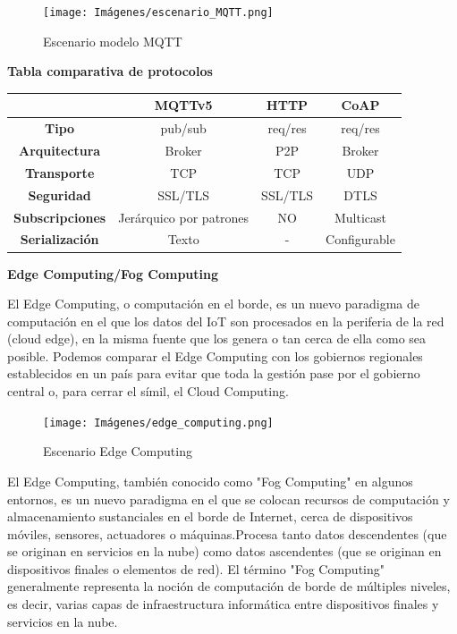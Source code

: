 \begin{figure}[ht]
    \centering
    \texttt{[image: Imágenes/escenario\_MQTT.png]}
    \caption{Escenario modelo MQTT}
    \label{fig:mqtt_escenario}
\end{figure}

\vspace{1cm}

\textbf{Tabla comparativa de protocolos}

\begin{table}[ht]
    \centering
    \begin{tabular}{|c|c|c|c|}
        \hline
        \textbf{} & \textbf{MQTTv5} & \textbf{HTTP} & \textbf{CoAP} \\
        \hline
        \textbf{Tipo} & pub/sub  & req/res & req/res \\
        \hline
        \textbf{Arquitectura} & Broker  & P2P & Broker \\
        \hline
        \textbf{Transporte} & TCP  & TCP & UDP \\
        \hline
        \textbf{Seguridad} & SSL/TLS  & SSL/TLS & DTLS \\
        \hline
        \textbf{Subscripciones} & Jerárquico por patrones & NO & Multicast \\
        \hline
        \textbf{Serialización} & Texto  & - & Configurable \\
        \hline
    \end{tabular}
    \label{tab:protocolos_comunicacion}
\end{table}


\textbf{Edge Computing/Fog Computing}

El Edge Computing, o computación en el borde, es un nuevo paradigma de computación en el que los datos del IoT son procesados en la periferia de la red (cloud edge), en la misma fuente que los genera o tan cerca de ella como sea posible. Podemos comparar el Edge Computing con los gobiernos regionales establecidos en un país para evitar que toda la gestión pase por el gobierno central o, para cerrar el símil, el Cloud Computing.\cite{Iberdrola}

\begin{figure}[ht]
    \centering
    \texttt{[image: Imágenes/edge\_computing.png]}
    \caption{Escenario Edge Computing}
    \label{fig:edge_computing}
\end{figure}

El Edge Computing, también conocido como "Fog Computing" en algunos entornos,  es un nuevo paradigma en el que se colocan recursos de computación y almacenamiento sustanciales en el borde de Internet, cerca de  dispositivos móviles, sensores, actuadores o máquinas.Procesa tanto datos descendentes (que se originan en servicios en la nube) como datos ascendentes (que se originan en dispositivos finales o elementos de red). El término "Fog Computing" generalmente representa la noción de computación de borde de múltiples niveles, es decir, varias capas de infraestructura informática entre dispositivos finales y servicios en la nube.

